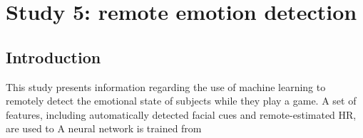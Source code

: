 \section{Study 5: remote emotion detection}
\label{s:experiment1-study5}

\subsection{Introduction}

This study presents information regarding the use of machine learning to remotely detect the emotional state of subjects while they play a game. A set of features, including automatically detected facial cues and remote-estimated HR, are used to  A neural network is trained from




